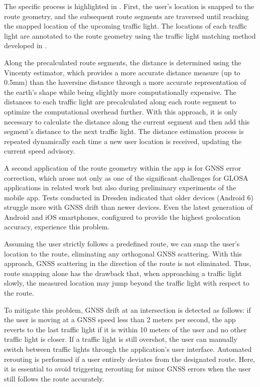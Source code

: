 The specific process is highlighted in . First, the user's location is snapped to the route geometry, and the subsequent route segments are traversed until reaching the snapped location of the upcoming traffic light. The locations of each traffic light are annotated to the route geometry using the traffic light matching method developed in .

Along the precalculated route segments, the distance is determined using the Vincenty estimator, which provides a more accurate distance measure (up to 0.5mm) than the haversine distance through a more accurate representation of the earth's shape while being slightly more computationally expensive. The distances to each traffic light are precalculated along each route segment to optimize the computational overhead further. With this approach, it is only necessary to calculate the distance along the current segment and then add this segment's distance to the next traffic light. The distance estimation process is repeated dynamically each time a new user location is received, updating the current speed advisory.

A second application of the route geometry within the app is for GNSS error correction, which arose not only as one of the significant challenges for GLOSA applications in related work but also during preliminary experiments of the mobile app. Tests conducted in Dresden indicated that older devices (Android 6) struggle more with GNSS drift than newer devices. Even the latest generation of Android and iOS smartphones, configured to provide the highest geolocation accuracy, experience this problem.

Assuming the user strictly follows a predefined route, we can snap the user's location to the route, eliminating any orthogonal GNSS scattering. With this approach, GNSS scattering in the direction of the route is not eliminated. Thus, route snapping alone has the drawback that, when approaching a traffic light slowly, the measured location may jump beyond the traffic light with respect to the route. 

To mitigate this problem, GNSS drift at an intersection is detected as follows: if the user is moving at a GNSS speed less than 2 meters per second, the app reverts to the last traffic light if it is within 10 meters of the user and no other traffic light is closer. If a traffic light is still overshot, the user can manually switch between traffic lights through the application's user interface. Automated rerouting is performed if a user entirely deviates from the designated route. Here, it is essential to avoid triggering rerouting for minor GNSS errors when the user still follows the route accurately.

